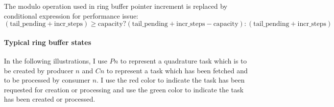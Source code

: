 \documentclass[11pt, a4paper]{article}
\begin{document}
\begin{mycomment}
  The modulo operation used in ring buffer pointer increment is replaced by conditional
  expression for performance issue:
  $$
  (\text{tail\_pending} + \text{incr\_steps}) \geq \text{capacity} ?
  (\text{tail\_pending} + \text{incr\_steps} - \text{capacity}) :
  (\text{tail\_pending} + \text{incr\_steps})
  $$
\end{mycomment}

\paragraph{Typical ring buffer states}

In the following illustrations, I use $Pn$ to represent a quadrature task which is to be
created by producer $n$ and $Cn$ to represent a task which has been fetched and to be
processed by consumer $n$. I use the red color to indicate the task has been requested for
creation or processing and use the green color to indicate the task has been created or
processed.
\end{document}
